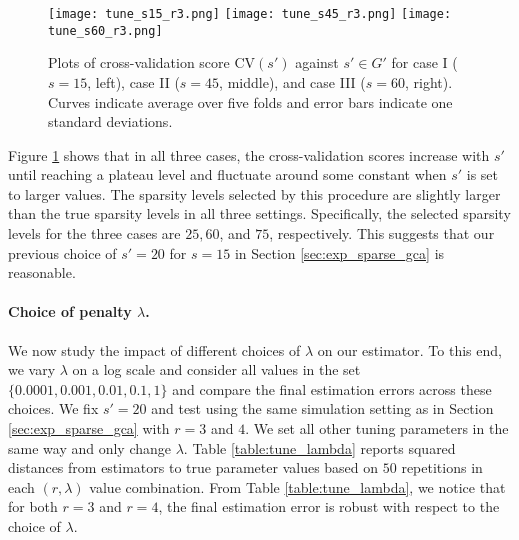 \documentclass[11pt]{article}
\newcommand{\0}{{\mathbf{0}}}
\begin{document}
\begin{figure}[htp]

\centering
\texttt{[image: tune\_s15\_r3.png]}\hfill
\texttt{[image: tune\_s45\_r3.png]}\hfill
\texttt{[image: tune\_s60\_r3.png]}\hfill

\caption{Plots of cross-validation score $\mathrm{CV}(s')$ against $s'\in G'$ for case I ($s=15$, left), case II ($s=45$, middle), and case III ($s=60$, right).
Curves indicate average over five folds and error bars indicate one standard deviations.
}
\label{Figure:tuning-sparsity}

\end{figure}

\par Figure \ref{Figure:tuning-sparsity} shows that in all three cases, the cross-validation scores increase with $s'$ until reaching a plateau level and fluctuate around some constant when $s'$ is set to larger values. 
The sparsity levels selected by this procedure are slightly larger than the true sparsity levels in all three settings. 
Specifically, the selected sparsity levels for the three cases are $25, 60$, and $75$, respectively. 
This suggests that our previous choice of $s'=20$ for $s=15$ in Section \ref{sec:exp_sparse_gca} is reasonable. 

\paragraph{Choice of penalty $\lambda$.} We now study the impact of different choices of $\lambda$ on our estimator. 
To this end, we vary $\lambda$ on a log scale and consider all values in the set $\{0.0001, 0.001, 0.01, 0.1, 1\}$ and compare the final estimation errors across these choices. 
We fix $s'=20$ and test using the same simulation setting as in Section \ref{sec:exp_sparse_gca} with $r=3$ and $4$. 
We set all other tuning parameters in the same way and only change $\lambda$.
Table \ref{table:tune_lambda} reports squared distances from estimators to true parameter values based on $50$ repetitions in each $(r,\lambda)$ value combination. 
From Table \ref{table:tune_lambda}, we notice that for both $r=3$ and $r=4$, the final estimation error is robust with respect to the choice of $\lambda$. 
\end{document}
